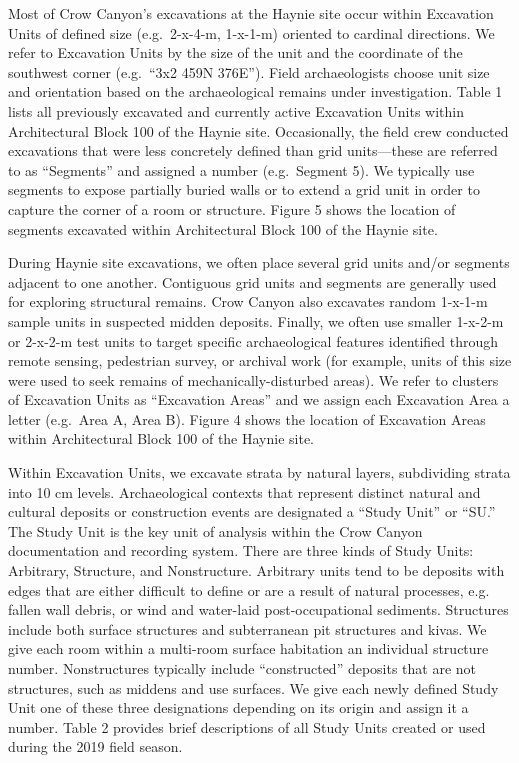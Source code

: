 \documentclass[
  12pt,
]{krantz}
\begin{document}
Most of Crow Canyon's excavations at the Haynie site occur within
Excavation Units of defined size (e.g.~2-x-4-m, 1-x-1-m) oriented to
cardinal directions. We refer to Excavation Units by the size of the
unit and the coordinate of the southwest corner (e.g.~``3x2 459N 376E'').
Field archaeologists choose unit size and orientation based on the
archaeological remains under investigation. Table 1 lists all previously
excavated and currently active Excavation Units within Architectural
Block 100 of the Haynie site. Occasionally, the field crew conducted
excavations that were less concretely defined than grid units---these
are referred to as ``Segments'' and assigned a number (e.g.~Segment 5). We
typically use segments to expose partially buried walls or to extend a
grid unit in order to capture the corner of a room or structure. Figure
5 shows the location of segments excavated within Architectural Block
100 of the Haynie site.

During Haynie site excavations, we often place several grid units and/or
segments adjacent to one another. Contiguous grid units and segments are
generally used for exploring structural remains. Crow Canyon also
excavates random 1-x-1-m sample units in suspected midden deposits.
Finally, we often use smaller 1-x-2-m or 2-x-2-m test units to target
specific archaeological features identified through remote sensing,
pedestrian survey, or archival work (for example, units of this size
were used to seek remains of mechanically-disturbed areas). We refer to
clusters of Excavation Units as ``Excavation Areas'' and we assign each
Excavation Area a letter (e.g.~Area A, Area B). Figure 4 shows the
location of Excavation Areas within Architectural Block 100 of the
Haynie site.

Within Excavation Units, we excavate strata by natural layers,
subdividing strata into 10 cm levels. Archaeological contexts that
represent distinct natural and cultural deposits or construction events
are designated a ``Study Unit'' or ``SU.'' The Study Unit is the key unit of
analysis within the Crow Canyon documentation and recording system.
There are three kinds of Study Units: Arbitrary, Structure, and
Nonstructure. Arbitrary units tend to be deposits with edges that are
either difficult to define or are a result of natural processes, e.g.
fallen wall debris, or wind and water-laid post-occupational sediments.
Structures include both surface structures and subterranean pit
structures and kivas. We give each room within a multi-room surface
habitation an individual structure number. Nonstructures typically
include ``constructed'' deposits that are not structures, such as middens
and use surfaces. We give each newly defined Study Unit one of these
three designations depending on its origin and assign it a number. Table
2 provides brief descriptions of all Study Units created or used during
the 2019 field season.
\end{document}
